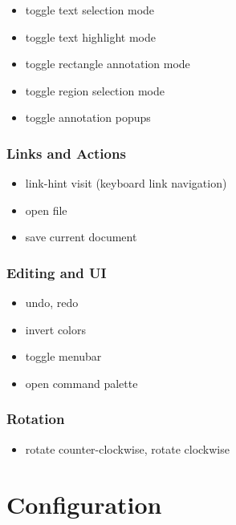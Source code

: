 \documentclass[a4paper,12pt]{article}
\begin{document}
\begin{itemize}[leftmargin=*]
    \item {} toggle text selection mode
    \item {} toggle text highlight mode
    \item {} toggle rectangle annotation mode
    \item {} toggle region selection mode
    \item {} toggle annotation popups
\end{itemize}

\subsubsection{Links and Actions}
\begin{itemize}[leftmargin=*]
    \item {} link-hint visit (keyboard link navigation)
    \item {} open file
    \item {} save current document
\end{itemize}

\subsubsection{Editing and UI}
\begin{itemize}[leftmargin=*]
    \item {} undo, \quad {} redo
    \item {} invert colors
    \item {} toggle menubar
    \item \keys{:} open command palette
\end{itemize}

\subsubsection{Rotation}
\begin{itemize}[leftmargin=*]
    \item \keys{<} rotate counter-clockwise, \quad \keys{>} rotate clockwise
\end{itemize}

\section{Configuration}
\end{document}
